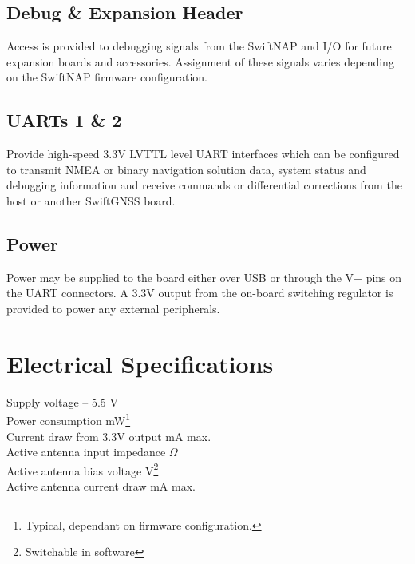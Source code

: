 \documentclass{article}
\newenvironment{mpar}{\par\noindent\minipage{\linewidth}}{\endminipage\par}
\begin{document}
\begin{multicols*}{2}
\subsection*{Debug \& Expansion Header}

Access is provided to debugging signals from the SwiftNAP and I/O for future
expansion boards and accessories. Assignment of these signals varies depending
on the SwiftNAP firmware configuration.

\subsection*{UARTs 1 \& 2}

Provide high-speed 3.3V LVTTL level UART interfaces which can be configured to
transmit NMEA or binary navigation solution data, system status and debugging
information and receive commands or differential corrections from the host or
another SwiftGNSS board.

\subsection*{Power}

Power may be supplied to the board either over USB or through the V+ pins on the
UART connectors. A 3.3V output from the on-board switching regulator is
provided to power any external peripherals.

\end{multicols*}

\pagebreak

\section*{Electrical Specifications}

\begin{mpar}
\begin{multicols}{2}
  \noindent
  Supply voltage  -- 5.5 V \\
  Power consumption  mW\footnote{Typical, dependant on firmware configuration.} \\
  Current draw from 3.3V output  mA max.\\
  Active antenna input impedance  $\Omega$ \\
  Active antenna bias voltage  V\footnote{Switchable in software}\\
  Active antenna current draw  mA max.
\end{multicols}
\end{mpar}
\end{document}
